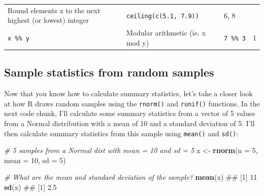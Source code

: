 \documentclass[]{book}
\newenvironment{Shaded}{\begin{snugshade}}{\end{snugshade}}
\newcommand{\KeywordTok}[1]{\textcolor[rgb]{0.13,0.29,0.53}{\textbf{#1}}}
\newcommand{\DataTypeTok}[1]{\textcolor[rgb]{0.13,0.29,0.53}{#1}}
\newcommand{\DecValTok}[1]{\textcolor[rgb]{0.00,0.00,0.81}{#1}}
\newcommand{\StringTok}[1]{\textcolor[rgb]{0.31,0.60,0.02}{#1}}
\newcommand{\CommentTok}[1]{\textcolor[rgb]{0.56,0.35,0.01}{\textit{#1}}}
\newcommand{\NormalTok}[1]{#1}
\theoremstyle{definition}
\theoremstyle{definition}
\theoremstyle{remark}
\begin{document}
\begin{longtable}[]{@{}llll@{}}
\begin{minipage}[t]{0.24\columnwidth}
Round elements x to the next highest (or lowest) integer\strut
\end{minipage} & \begin{minipage}[t]{0.33\columnwidth}\raggedright\strut
\texttt{ceiling(c(5.1,\ 7.9))}\strut
\end{minipage} & \begin{minipage}[t]{0.15\columnwidth}\raggedright\strut
6, 8\strut
\end{minipage}\tabularnewline
\begin{minipage}[t]{0.17\columnwidth}\raggedright\strut
\texttt{x\ \%\%\ y}\strut
\end{minipage} & \begin{minipage}[t]{0.24\columnwidth}\raggedright\strut
Modular arithmetic (ie. x mod y)\strut
\end{minipage} & \begin{minipage}[t]{0.33\columnwidth}\raggedright\strut
\texttt{7\ \%\%\ 3}\strut
\end{minipage} & \begin{minipage}[t]{0.15\columnwidth}\raggedright\strut
1\strut
\end{minipage}\tabularnewline
\bottomrule
\end{longtable}

\subsection{Sample statistics from random
samples}\label{sample-statistics-from-random-samples}

Now that you know how to calculate summary statistics, let's take a
closer look at how R draws random samples using the \texttt{rnorm()} and
\texttt{runif()} functions. In the next code chunk, I'll calculate some
summary statistics from a vector of 5 values from a Normal distribution
with a mean of 10 and a standard deviation of 5. I'll then calculate
summary statistics from this sample using \texttt{mean()} and
\texttt{sd()}:

\begin{Shaded}
\begin{Highlighting}[]
\CommentTok{# 5 samples from a Normal dist with mean = 10 and sd = 5}
\NormalTok{x <-}\StringTok{ }\KeywordTok{rnorm}\NormalTok{(}\DataTypeTok{n =} \DecValTok{5}\NormalTok{, }\DataTypeTok{mean =} \DecValTok{10}\NormalTok{, }\DataTypeTok{sd =} \DecValTok{5}\NormalTok{)}

\CommentTok{# What are the mean and standard deviation of the sample?}
\KeywordTok{mean}\NormalTok{(x)}
\NormalTok{## [1] 11}
\KeywordTok{sd}\NormalTok{(x)}
\NormalTok{## [1] 2.5}
\end{Highlighting}
\end{Shaded}
\end{document}
